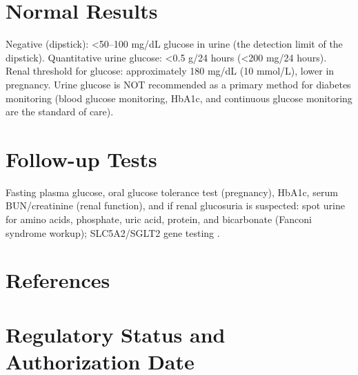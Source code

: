 \section*{Normal Results}
Negative (dipstick): <50--100 mg/dL glucose in urine (the detection limit of the dipstick). Quantitative urine glucose: <0.5 g/24 hours (<200 mg/24 hours). Renal threshold for glucose: approximately 180 mg/dL (10 mmol/L), lower in pregnancy. Urine glucose is NOT recommended as a primary method for diabetes monitoring (blood glucose monitoring, HbA1c, and continuous glucose monitoring are the standard of care).
\section*{Follow-up Tests}
Fasting plasma glucose, oral glucose tolerance test (pregnancy), HbA1c, serum BUN/creatinine (renal function), and if renal glucosuria is suspected: spot urine for amino acids, phosphate, uric acid, protein, and bicarbonate (Fanconi syndrome workup); SLC5A2/SGLT2 gene testing \cite{santer2003molecular}.
\section*{References}


\clearpage
\section*{Regulatory Status and Authorization Date}

\clearpage
